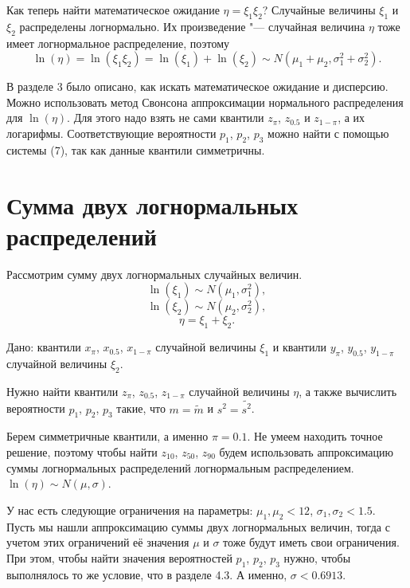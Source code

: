 \documentclass[12pt]{article}
\begin{document}
	
	
	Как теперь найти математическое ожидание $\eta = \xi_{1}\xi_{2}$?
	Случайные величины $\xi_{1}$ и $\xi_{2}$ распределены логнормально. Их произведение "--- случайная величина $\eta$ тоже имеет логнормальное распределение, поэтому
	\begin{equation*}
		\ln(\eta) = \ln(\xi_{1}\xi_{2}) = \ln(\xi_{1}) + \ln(\xi_{2}) \sim N(\mu_{1} + \mu_{2}, \sigma _{1}^{2} + \sigma _{2}^{2}).
	\end{equation*}
	
	В разделе 3 было описано, как искать математическое ожидание и дисперсию.
	Можно использовать метод Свонсона аппроксимации нормального распределения для $\ln(\eta)$. Для этого надо взять не сами квантили $z_{\pi}$, $z_{0.5}$ и  $z_{1-\pi}$, а их логарифмы. 
	Соответствующие вероятности $p_{1}$, $p_{2}$, $p_{3}$
	можно найти с помощью системы (7), так как данные квантили симметричны.
	
	
	\section{Сумма двух логнормальных распределений}
	
	Рассмотрим сумму двух логнормальных случайных величин.
	\begin{equation*}
		\ln(\xi_{1}) \sim N(\mu_{1}, \sigma _{1}^{2}),
	\end{equation*}
	\begin{equation*}
		\ln(\xi_{2}) \sim N(\mu_{2}, \sigma _{2}^{2}),
	\end{equation*}
	\begin{equation*}
		\eta = \xi_{1}+\xi_{2}.
	\end{equation*}
	
	Дано: квантили $x_{\pi}$, $x_{0.5}$, $x_{1-\pi}$ случайной величины $\xi_1$ и  квантили $y_{\pi}$, $y_{0.5}$, $y_{1-\pi}$ случайной величины $\xi_2$.
	
	Нужно найти квантили $z_{\pi}$, $z_{0.5}$, $z_{1-\pi}$ случайной величины $\eta$, а также вычислить вероятности $p_{1}$, $p_{2}$, $p_{3}$ такие, что $m = \tilde{m}$  и $s^{2} = \tilde{s^{2}}$.
	
	Берем симметричные квантили, а именно $\pi = 0.1$. 	Не умеем находить точное решение, поэтому чтобы найти $z_{10}$, $z_{50}$, $z_{90}$ будем использовать аппроксимацию суммы логнормальных распределений логнормальным распределением. $\ln(\eta)\sim N(\mu, \sigma)$.
	
	У нас есть следующие ограничения на параметры: $\mu_{1}, \mu_{2} < 12$, $\sigma_{1}, \sigma_{2} < 1.5$. Пусть мы нашли аппроксимацию суммы двух логнормальных величин, тогда с учетом этих ограничений её значения $\mu$ и $\sigma$ тоже будут иметь свои ограничения. При этом, чтобы найти значения вероятностей $p_{1}$, $p_{2}$, $p_{3}$ нужно, чтобы выполнялось то же условие, что в разделе 4.3. А именно, $\sigma < 0.6913.$
	
\end{document}
